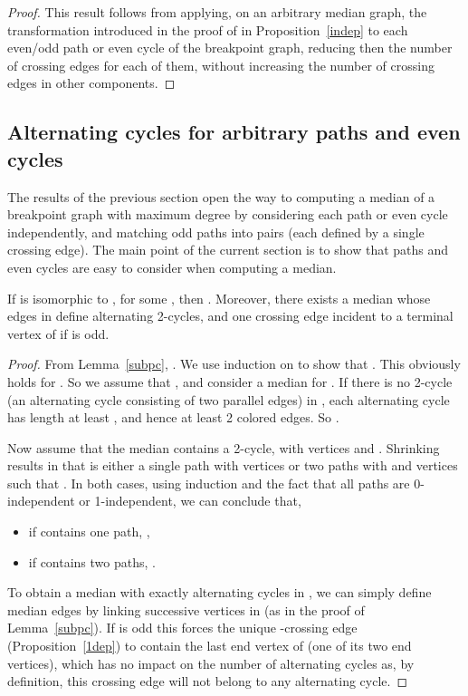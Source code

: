 \documentclass[10pt]{llncs}
\begin{document}
\begin{proof}
  This result follows from applying, on an arbitrary median graph, the
  transformation introduced in the proof of in Proposition~\ref{indep}
  to each even/odd path or even cycle of the breakpoint graph,
  reducing then the number of crossing edges for each of them, without
  increasing the number of crossing edges in other components.  \end{proof}


\subsection{Alternating cycles for arbitrary paths and even cycles}

The results of the previous section open the way to computing a median
of a breakpoint graph with maximum degree  by considering each path
or even cycle independently, and matching odd paths into pairs (each
defined by a single crossing edge).  The main point of the current
section is to show that paths and even cycles are easy to consider
when computing a median.

\begin{proposition} \label{cycP}
  If  is isomorphic to , for some , then
  . Moreover, there exists
  a median whose edges in  define 
  alternating 2-cycles, and one crossing edge incident to a terminal
  vertex of  if  is odd.
\end{proposition}

\begin{proof}
  From Lemma~\ref{subpc}, . We use induction on  to show that
  . This obviously
  holds for . So we assume that , and consider a
  median  for . If there is no 2-cycle (an alternating cycle
  consisting of two parallel edges) in , each alternating cycle
  has length at least , and hence at least 2 colored edges. So
  .

  Now assume that the median  contains a 2-cycle, with vertices 
  and . Shrinking  results in  that is either a
  single path with  vertices or two paths with  and 
  vertices such that .  In both cases, using induction and
  the fact that all paths are 0-independent or 1-independent, we can
  conclude that,
  \begin{itemize}
  \item if  contains one path, ,
  \item if  contains two paths, .
  \end{itemize}
  To obtain a median with exactly 
  alternating cycles in , we can simply define median edges by
  linking successive vertices in  (as in the proof of
  Lemma~\ref{subpc}). If  is odd this forces the unique
  -crossing edge (Proposition~\ref{1dep}) to contain the last end
  vertex of  (one of its two end vertices), which has no impact on
  the number of alternating cycles as, by definition, this crossing
  edge will not belong to any alternating cycle.  \end{proof}
\end{document}
